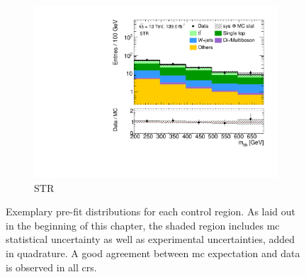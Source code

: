 \begin{figure}
\begin{subfigure}[b]{0.5\linewidth}
		\centering\includegraphics[width=1.0\textwidth]{1Lbb_STR_mbb}
		\caption{STR\label{fig:signal_contaminations_STCR}}
	\end{subfigure}\hfill

	\caption{Exemplary pre-fit distributions for each control region. As laid out in the beginning of this chapter, the shaded region includes \gls{mc} statistical uncertainty as well as experimental uncertainties, added in quadrature. A good agreement between \gls{mc} expectation and data is observed in all \glspl{cr}.}
	\label{fig:CR_distributions_prefit}
\end{figure}

